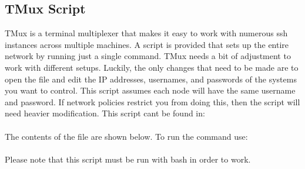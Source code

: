 

\subsection{TMux Script}

TMux is a terminal multiplexer that makes it easy to work with numerous ssh instances across multiple machines. A script is provided that sets up the entire network by running just a single command. TMux needs a bit of adjustment to work with different setups. Luckily, the only changes that need to be made are to open the file and edit the IP addresses, usernames, and passwords of the systems you want to control. This script assumes each node will have the same username and password. If network policies restrict you from doing this, then the script will need heavier modification. This script cant be found in: \\

 \\

The contents of the file are shown below. To run the command use: \\

 \\

Please note that this script must be run with bash in order to work. 

